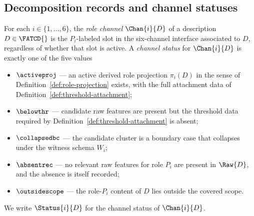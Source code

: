 \subsection{Decomposition records and channel statuses}\label{subsec:dec-records}

\begin{definition}\label{def:channel-status}
For each \(i \in \{1,\ldots,6\}\), the \emph{role channel}
\(\Chan{i}{D}\) of a description \(D \in \FATCD{}\) is the
\(P_i\)-labeled slot in the six-channel interface associated to \(D\),
regardless of whether that slot is active. A \emph{channel status} for
\(\Chan{i}{D}\) is exactly one of the five values
\begin{itemize}[topsep=2pt,itemsep=1pt]
  \item \(\activeproj\) --- an active derived role projection
    \(\pi_i(D)\) in the sense of
    Definition~\ref{def:role-projection} exists, with the full
    attachment data of
    Definition~\ref{def:threshold-attachment};
  \item \(\belowthr\) --- candidate raw features are present but the
    threshold data required by
    Definition~\ref{def:threshold-attachment} is absent;
  \item \(\collapsedbc\) --- the candidate cluster is a boundary case
    that collapses under the witness schema \(W_i\);
  \item \(\absentrec\) --- no relevant raw features for role \(P_i\) are
    present in \(\Raw{D}\), and the absence is itself recorded;
  \item \(\outsidescope\) --- the role-\(P_i\) content of \(D\) lies
    outside the covered scope.
\end{itemize}
We write \(\Status{i}{D}\) for the channel status of \(\Chan{i}{D}\).
\end{definition}

